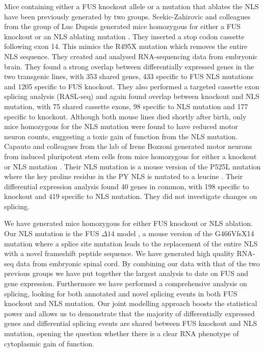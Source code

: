 Mice containing either a FUS knockout allele or a mutation that ablates the NLS have been previously generated by two groups. 
Scekic-Zahirovic and colleagues from the group of Luc Dupuis generated mice homozygous for either a FUS knockout or an NLS ablating mutation \cite{Scekic-zahirovic2016}. 
They inserted a stop codon cassette following exon 14. This mimics the R495X mutation which removes the entire NLS sequence.
They created and analysed RNA-sequencing data from embryonic brain. 
They found a strong overlap between differentially expressed genes in the two transgenic lines, with 353 shared genes, 433 specific to FUS NLS mutations and 1205 specific to FUS knockout. 
They also performed a targeted cassette exon splicing analysis (RASL-seq) and again found overlap between knockout and NLS mutation, with 75 shared cassette exons, 98 specific to NLS mutation and 177 specific to knockout. 
Although both mouse lines died shortly after birth, only mice homozygous for the NLS mutation were found to have reduced motor neuron counts, suggesting a toxic gain of function from the NLS mutation.
Capauto and colleagues from the lab of Irene Bozzoni generated motor neurons from induced pluripotent stem cells from mice homozygous for either a knockout or NLS mutation \cite{Capauto2018}.
Their NLS mutation is a mouse version of the P525L mutation where the key proline residue in the PY NLS is mutated to a leucine \citep{Chio2009}. 
Their differential expression analysis found 40 genes in common, with 198 specific to knockout and 419 specific to NLS mutation. 
They did not investigate changes on splicing.

We have generated mice homozygous for either FUS knockout or NLS ablation. Our NLS mutation is the FUS $\Delta14$ model \citep{Devoy2017}, a mouse version of the G466VfsX14 mutation \citep{DeJesus-Hernandez2010} where a splice site mutation leads to the replacement of the entire NLS with a novel frameshift peptide sequence. 
We have generated high quality RNA-seq data from embryonic spinal cord.
By combining our data with that of the two previous groups we have put together the largest analysis to date on FUS and gene expression. 
Furthermore we have performed a comprehensive analysis on splicing, looking for both annotated and novel splicing events in both FUS knockout and NLS mutation.
Our joint modelling approach boosts the statistical power and allows us to demonstrate that the majority of differentially expressed genes and differential splicing events are shared between FUS knockout and NLS mutation, opening the question whether there is a clear RNA phenotype of cytoplasmic gain of function.





